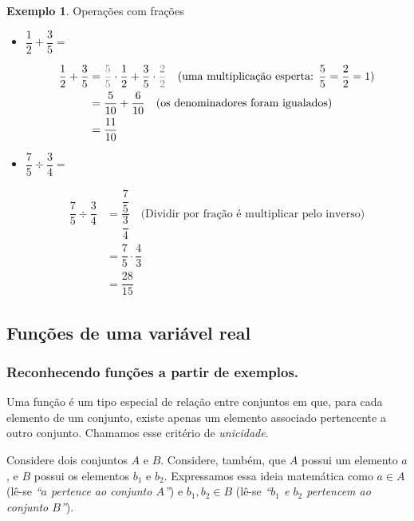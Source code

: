 \documentclass[12pt,openright,twoside,a4paper]{article}
\theoremstyle{definition}
\newtheorem{example}{Exemplo}[section]
\begin{document}
	\begin{example}Operações com frações
		\begin{itemize}
			\item[a)] $\displaystyle\dfrac{1}{2} + \dfrac{3}{5} =$
			
			\begin{align*}
				\dfrac{1}{2} + \dfrac{3}{5} &= {\textcolor{gray}{\dfrac{5}{5}}}\cdot\dfrac{1}{2} + \dfrac{3}{5} \cdot {\textcolor{gray}{\dfrac{2}{2}}} \quad \text{(uma multiplicação esperta: $\dfrac{5}{5} = \dfrac{2}{2} = 1$)}\\
				&= \dfrac{5}{10} + \dfrac{6}{10} \quad \text{(os denominadores foram igualados)}\\
				&= \dfrac{11}{10}
			\end{align*}
			
			\item[b)] $\displaystyle\dfrac{7}{5} \div \dfrac{3}{4} =$
			
			\begin{align*}
				\dfrac{7}{5} \div \dfrac{3}{4} &= \dfrac{\dfrac{7}{5}}{\dfrac{3}{4}} \quad \text{(Dividir por fração é multiplicar pelo inverso)}\\
				&= \dfrac{7}{5} \cdot \dfrac{4}{3}\\
				&= \dfrac{28}{15}
			\end{align*}
		\end{itemize}
	\end{example}
	
	\subsection{Funções de uma variável real}
	
	\subsubsection{Reconhecendo funções a partir de exemplos.}
	
	Uma função é um tipo especial de relação entre conjuntos em que, para cada elemento de um conjunto, existe apenas um elemento associado pertencente a outro conjunto. Chamamos esse critério de \textit{unicidade}.
	
	Considere dois conjuntos $A$ e $B$. Considere, também, que $A$ possui um elemento $a$, e $B$ possui os elementos $b_1$ e $b_2$. Expressamos essa ideia matemática como $a \in A$ (lê-se \textit{``$a$ pertence ao conjunto $A$''}) e $b_1, b_2 \in B$ (lê-se \textit{``$b_1$ e $b_2$ pertencem ao conjunto $B$''}). 
	
\end{document}
